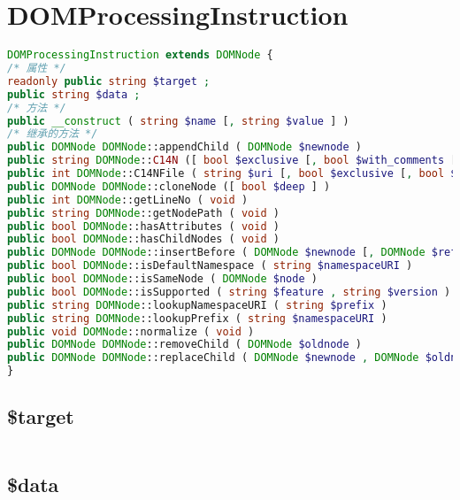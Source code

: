 \begin{lstlisting}[language=PHP]

\end{lstlisting}
\section{DOMProcessingInstruction}


\begin{lstlisting}[language=PHP]
DOMProcessingInstruction extends DOMNode {
/* 属性 */
readonly public string $target ;
public string $data ;
/* 方法 */
public __construct ( string $name [, string $value ] )
/* 继承的方法 */
public DOMNode DOMNode::appendChild ( DOMNode $newnode )
public string DOMNode::C14N ([ bool $exclusive [, bool $with_comments [, array $xpath [, array $ns_prefixes ]]]] )
public int DOMNode::C14NFile ( string $uri [, bool $exclusive [, bool $with_comments [, array $xpath [, array $ns_prefixes ]]]] )
public DOMNode DOMNode::cloneNode ([ bool $deep ] )
public int DOMNode::getLineNo ( void )
public string DOMNode::getNodePath ( void )
public bool DOMNode::hasAttributes ( void )
public bool DOMNode::hasChildNodes ( void )
public DOMNode DOMNode::insertBefore ( DOMNode $newnode [, DOMNode $refnode ] )
public bool DOMNode::isDefaultNamespace ( string $namespaceURI )
public bool DOMNode::isSameNode ( DOMNode $node )
public bool DOMNode::isSupported ( string $feature , string $version )
public string DOMNode::lookupNamespaceURI ( string $prefix )
public string DOMNode::lookupPrefix ( string $namespaceURI )
public void DOMNode::normalize ( void )
public DOMNode DOMNode::removeChild ( DOMNode $oldnode )
public DOMNode DOMNode::replaceChild ( DOMNode $newnode , DOMNode $oldnode )
}
\end{lstlisting}

\subsection{\$target}

\begin{lstlisting}[language=PHP]

\end{lstlisting}

\subsection{\$data}


\begin{lstlisting}[language=PHP]

\end{lstlisting}

